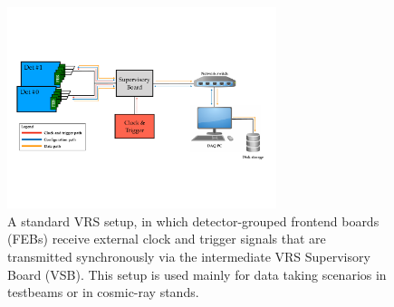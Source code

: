 \begin{figure}[!htb]
    \begin{center}
        \includegraphics[width=0.7\textwidth]{figures/nsw/vrs/vrs_diagramPDF}
        \caption{
            A standard VRS setup, in which detector-grouped frontend boards (FEBs) receive external clock
            and trigger signals that are transmitted synchronously via the intermediate VRS Supervisory Board (VSB).
            This setup is used mainly for data taking scenarios in testbeams or in cosmic-ray stands.
        }
        \label{fig:vrs_diagram}
    \end{center}
\end{figure}
\FloatBarrier



